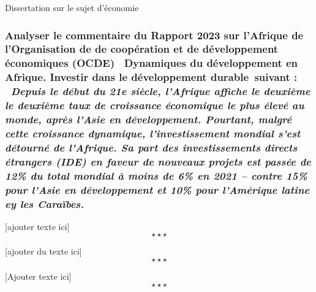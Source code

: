 \newpage \begin{bclogo}[barre=none,logo={}]{
	Dissertation sur le sujet d'économie
	}
		\subsubsection*{Analyser le commentaire du Rapport 2023 sur l'Afrique de l'Organisation de de coopération et de développement économiques (OCDE) \guillemetleft\ Dynamiques du développement en Afrique. Investir dans le développement durable\guillemetright\ suivant : \newline\newline \emph{\guillemetleft\ Depuis le début du 21e siècle, l'Afrique affiche le deuxième le deuxième taux de croissance économique le plus élevé au monde, après l'Asie en développement. Pourtant, malgré cette croissance dynamique, l'investissement mondial s'est détourné de l'Afrique. Sa part des investissements directs étrangers (IDE) en faveur de nouveaux projets est passée de 12\% du total mondial à moins de 6\% en 2021 – contre 15\% pour l'Asie en développement et 10\% pour l'Amérique latine ey les Caraïbes.\guillemetright}}
		
\end{bclogo}

[ajouter texte ici] $$\star \star \star$$

[ajouter du texte ici]$$\star \star \star$$

[Ajouter texte ici] $$\star \star \star$$
